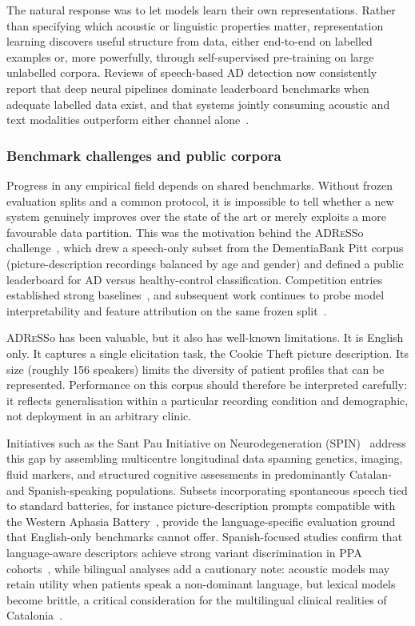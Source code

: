The natural response was to let models learn their own representations.
Rather than specifying which acoustic or linguistic properties matter, representation learning discovers useful structure from data, either end-to-end on labelled examples or, more powerfully, through self-supervised pre-training on large unlabelled corpora.
Reviews of speech-based AD detection now consistently report that deep neural pipelines dominate leaderboard benchmarks when adequate labelled data exist, and that systems jointly consuming acoustic and text modalities outperform either channel alone~\cite{ding2024speechsurvey}.

\subsubsection{Benchmark challenges and public corpora}
\label{ssec:benchmarks}

Progress in any empirical field depends on shared benchmarks.
Without frozen evaluation splits and a common protocol, it is impossible to tell whether a new system genuinely improves over the state of the art or merely exploits a more favourable data partition.
This was the motivation behind the \textsc{ADReSS}o challenge~\cite{luz2021adresso}, which drew a speech-only subset from the DementiaBank Pitt corpus (picture-description recordings balanced by age and gender) and defined a public leaderboard for AD versus healthy-control classification.
Competition entries established strong baselines~\cite{syed2021muetrmit}, and subsequent work continues to probe model interpretability and feature attribution on the same frozen split~\cite{ntampakis2025neuroxvocal}.

\textsc{ADReSS}o has been valuable, but it also has well-known limitations.
It is English only.
It captures a single elicitation task, the Cookie Theft picture description.
Its size (roughly 156 speakers) limits the diversity of patient profiles that can be represented.
Performance on this corpus should therefore be interpreted carefully: it reflects generalisation within a particular recording condition and demographic, not deployment in an arbitrary clinic.

Initiatives such as the Sant Pau Initiative on Neurodegeneration (SPIN)~\cite{alcolea2019spin} address this gap by assembling multicentre longitudinal data spanning genetics, imaging, fluid markers, and structured cognitive assessments in predominantly Catalan- and Spanish-speaking populations.
Subsets incorporating spontaneous speech tied to standard batteries, for instance picture-description prompts compatible with the Western Aphasia Battery~\cite{kertesz1982wab}, provide the language-specific evaluation ground that English-only benchmarks cannot offer.
Spanish-focused studies confirm that language-aware descriptors achieve strong variant discrimination in PPA cohorts~\cite{matias2019machineppa}, while bilingual analyses add a cautionary note: acoustic models may retain utility when patients speak a non-dominant language, but lexical models become brittle, a critical consideration for the multilingual clinical realities of Catalonia~\cite{pugalenthi2024bilingualppa}.

